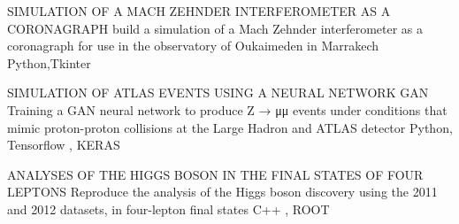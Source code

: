 %
%
%


\begin{projects}
	\project
	{SIMULATION OF A MACH ZEHNDER INTERFEROMETER AS A CORONAGRAPH}{}
	{}
	{build a simulation of a Mach Zehnder interferometer as a coronagraph for use in the observatory of Oukaimeden in Marrakech}
	{Python,Tkinter}
				
	\project
	{SIMULATION OF ATLAS EVENTS USING A NEURAL NETWORK GAN}{}
	{}
	{Training a GAN neural network to produce Z → μμ events under conditions that mimic proton-proton collisions at the Large Hadron and ATLAS detector}
	{Python, Tensorflow , KERAS}

	\project
	{ANALYSES OF THE HIGGS BOSON IN THE FINAL STATES OF FOUR LEPTONS}{}
	{}
	{Reproduce the analysis of the Higgs boson discovery using the 2011 and 2012 datasets, in four-lepton final states}
	{C++ , ROOT}


\end{projects}

